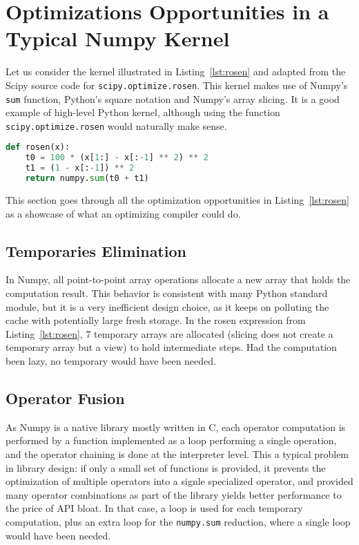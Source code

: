 \documentclass[10pt, preprint]{sigplanconf}
\begin{document}
\section{Optimizations Opportunities in a Typical Numpy Kernel}
\label{sec:optimize}

Let us consider the kernel illustrated in Listing~\ref{lst:rosen} and adapted
from the Scipy source code for \texttt{scipy.optimize.rosen}. This kernel makes
use of Numpy's \texttt{sum} function, Python's square notation and Numpy's
array slicing. It is a good example of high-level Python kernel, although
using the function \texttt{scipy.optimize.rosen} would naturally make sense.

\begin{lstlisting}[language=python, caption={High-level implementation of the rosenbrock function in Numpy}, float, label={lst:rosen}]
def rosen(x):
    t0 = 100 * (x[1:] - x[:-1] ** 2) ** 2
    t1 = (1 - x[:-1]) ** 2
    return numpy.sum(t0 + t1)
\end{lstlisting}

This section goes through all the optimization opportunities in
Listing~\ref{lst:rosen} as a showcase of what an optimizing compiler could do.


\subsection{Temporaries Elimination}

In Numpy, all point-to-point array operations allocate a new array that holds
the computation result. This behavior is consistent with many Python standard
module, but it is a very inefficient design choice, as it keeps on polluting
the cache with potentially large fresh storage. In the rosen expression from
Listing~\ref{lst:rosen}, 7 temporary arrays are allocated (slicing does not
create a temporary array but a view) to hold intermediate steps. Had the
computation been lazy, no temporary would have been needed.

\subsection{Operator Fusion}

As Numpy is a native library mostly written in C, each operator computation is
performed by a function implemented as a loop performing a single operation,
and the operator chaining is done at the interpreter level. This a typical
problem in library design: if only a small set of functions is provided, it
prevents the optimization of multiple operators into a signle specialized
operator, and provided many operator combinations as part of the library yields
better performance to the price of API bloat. In that case, a loop is used for
each temporary computation, plus an extra loop for the \texttt{numpy.sum}
reduction, where a single loop would have been needed.
\end{document}
